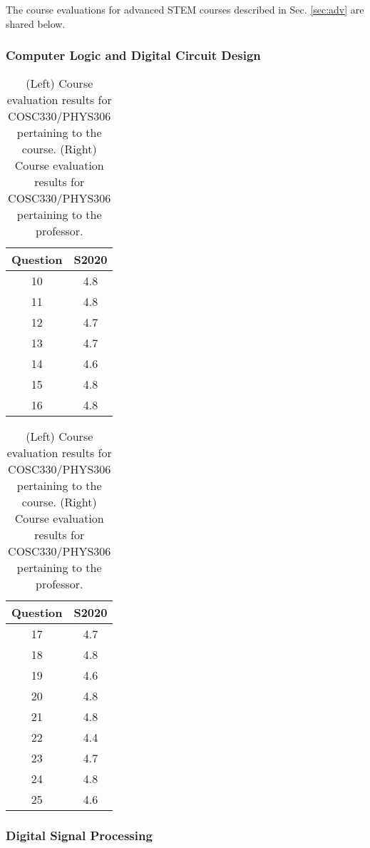 \documentclass[../../main.tex]{subfiles}
\begin{document}
The course evaluations for advanced STEM courses described in Sec. \ref{sec:adv} are shared below.

\subsubsection{Computer Logic and Digital Circuit Design}

\begin{table}
\footnotesize
\centering
\begin{tabular}{| c | c |}
\hline
\hline
Question & S2020 \\ \hline
10 & 4.8 \\ \hline
11 & 4.8 \\ \hline
12 & 4.7 \\ \hline
13 & 4.7 \\ \hline
14 & 4.6 \\ \hline
15 & 4.8 \\ \hline
16 & 4.8 \\ \hline
\hline
\end{tabular}
\begin{tabular}{| c | c |}
\hline
\hline
Question & S2020 \\ \hline
17 & 4.7 \\ \hline
18 & 4.8 \\ \hline
19 & 4.6 \\ \hline
20 & 4.8 \\ \hline
21 & 4.8 \\ \hline
22 & 4.4 \\ \hline
23 & 4.7 \\ \hline
24 & 4.8 \\ \hline
25 & 4.6 \\ \hline
\hline
\end{tabular}
\caption{\label{tab:eval_330_306} (Left) Course evaluation results for COSC330/PHYS306 pertaining to the course.  (Right) Course evaluation results for COSC330/PHYS306 pertaining to the professor.}
\end{table}

\subsubsection{Digital Signal Processing}
\end{document}
